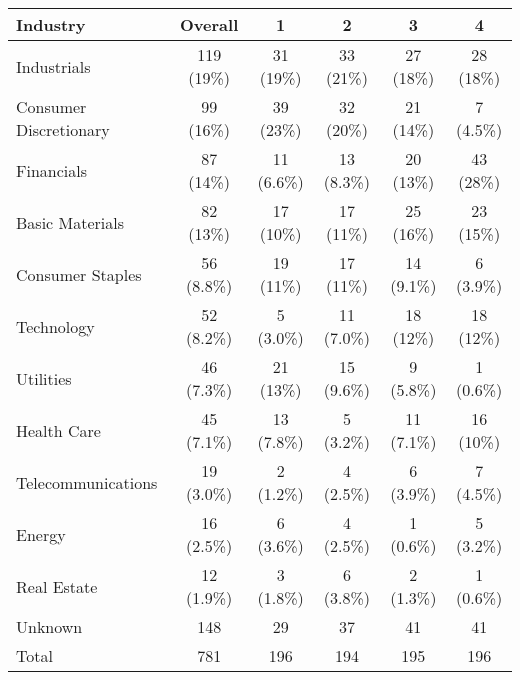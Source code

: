 \documentclass[12pt]{article}
\begin{document}
\begin{table}
    \centering
    \label{tab:industries}
    \begin{tabular}{lccccc}
    \toprule
    Industry & Overall & 1 & 2 & 3 & 4 \\
    \midrule
    Industrials & 119 (19\%) & 31 (19\%) & 33 (21\%) & 27 (18\%) & 28 (18\%)\\
    Consumer Discretionary & 99 (16\%) & 39 (23\%) & 32 (20\%) & 21 (14\%) & 7 (4.5\%)\\
    Financials & 87 (14\%) & 11 (6.6\%) & 13 (8.3\%) & 20 (13\%) & 43 (28\%)\\
    Basic Materials & 82 (13\%) & 17 (10\%) & 17 (11\%) & 25 (16\%) & 23 (15\%)\\
    Consumer Staples & 56 (8.8\%) & 19 (11\%) & 17 (11\%) & 14 (9.1\%) & 6 (3.9\%)\\
    Technology & 52 (8.2\%) & 5 (3.0\%) & 11 (7.0\%) & 18 (12\%) & 18 (12\%)\\
    Utilities & 46 (7.3\%) & 21 (13\%) & 15 (9.6\%) & 9 (5.8\%) & 1 (0.6\%)\\
    Health Care & 45 (7.1\%) & 13 (7.8\%) & 5 (3.2\%) & 11 (7.1\%) & 16 (10\%)\\
    Telecommunications & 19 (3.0\%) & 2 (1.2\%) & 4 (2.5\%) & 6 (3.9\%) & 7 (4.5\%)\\
    Energy & 16 (2.5\%) & 6 (3.6\%) & 4 (2.5\%) & 1 (0.6\%) & 5 (3.2\%)\\
    Real Estate & 12 (1.9\%) & 3 (1.8\%) & 6 (3.8\%) & 2 (1.3\%) & 1 (0.6\%)\\
    Unknown & 148 & 29 & 37 & 41 & 41\\
    \midrule 
    Total & 781 & 196 & 194 & 195 & 196\\
    \bottomrule
    \end{tabular}

\end{table}

\end{document}
